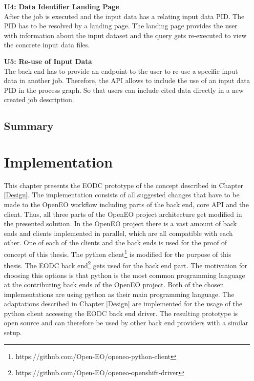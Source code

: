\documentclass[draft,final]{vutinfth} %
\begin{document}
\textbf{U4: Data Identifier Landing Page} \\
After the job is executed and the input data has a relating input data PID. The PID has to be resolved by a landing page. The landing page provides the user with information about the input dataset and the query gets re-executed to view the concrete input data files.
    
\textbf{U5: Re-use of Input Data} \\
 The back end has to provide an endpoint to the user to re-use a specific input data in another job. Therefore, the API allows to include the use of an input data PID in the process graph. So that users can include cited data directly in a new created job description.  

\section{Summary}

\chapter{Implementation}\label{Implementation}
This chapter presents the EODC prototype of the concept described in Chapter \ref{Design}. The implementation consists of all suggested changes that have to be made to the OpenEO workflow including parts of the back end, core API and the client. Thus, all three parts of the OpenEO project architecture get modified in the presented solution. In the OpenEO project there is a vast amount of back ends and clients implemented in parallel, which are all compatible with each other. One of each of the clients and the back ends is used for the proof of concept of this thesis. The python client\footnote{https://github.com/Open-EO/openeo-python-client} is modified for the purpose of this thesis. The EODC back end\footnote{https://github.com/Open-EO/openeo-openshift-driver} gets used for the back end part. The motivation for choosing this options is that python is the most common programming language at the contributing back ends of the OpenEO project. Both of the chosen implementations are using python as their main programming language. The adaptations described in Chapter \ref{Design} are implemented for the usage of the python client accessing the EODC back end driver. The resulting prototype is open source and can therefore be used by other back end providers with a similar setup.  
\end{document}
